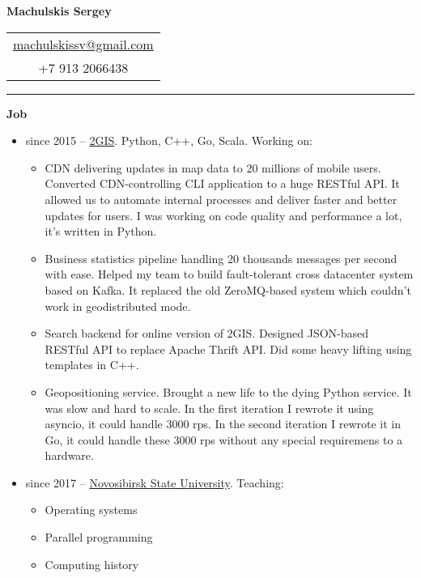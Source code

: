 \documentclass[final]{letter}
\begin{document}
\begin{center}

{\fontsize{25}{40}\selectfont\bf{Machulskis Sergey}}
  {\hfill
    \begin{tabular}{c}
        \href{mailto:machulskissv@gmail.com}{machulskissv@gmail.com}\\
        +7 913 2066438\\
     \end{tabular}
  }
\rule{.98\textwidth}{1pt}

\addvspace{.1cm}

\end{center}

{\bf Job}
\begin{itemize}
  \item since 2015 -- \href{https://2gis.com}{2GIS}. Python, C++, Go, Scala. Working on:
  \begin{itemize}
    \item CDN delivering updates in map data to 20 millions of mobile users. Converted CDN-controlling CLI application to a huge RESTful API. It allowed us to automate internal processes and deliver faster and better updates for users. I was working on code quality and performance a lot, it's written in Python.
    \item Business statistics pipeline handling 20 thousands messages per second with ease. Helped my team to build fault-tolerant cross datacenter system based on Kafka. It replaced the old ZeroMQ-based system which couldn't work in geodistributed mode.
    \item Search backend for online version of 2GIS. Designed JSON-based RESTful API to replace Apache Thrift API. Did some heavy lifting using templates in C++.
    \item Geopositioning service. Brought a new life to the dying Python service. It was slow and hard to scale. In the first iteration I rewrote it using asyncio, it could handle 3000 rps. In the second iteration I rewrote it in Go, it could handle these 3000 rps without any special requiremens to a hardware.
  \end{itemize}

  \item since 2017 -- \href{http://fit.nsu.ru/}{Novosibirsk State University}. Teaching:
  \begin{itemize}
    \item Operating systems
    \item Parallel programming
    \item Computing history
  \end{itemize}
\end{itemize}
\end{document}
